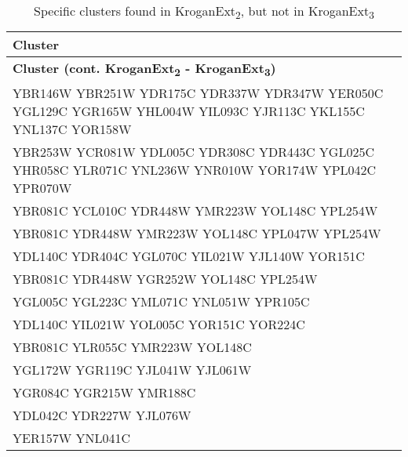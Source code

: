 \setlength{\extrarowheight}{2pt}
\renewcommand{\arraystretch}{1.2}
\begin{longtable}{| m{27em} |}
\caption{Specific clusters found in KroganExt\textsubscript{2}, but not in KroganExt\textsubscript{3}} \\
\hline
\textbf{Cluster} \\
\hline
\endfirsthead
\hline
\textbf{Cluster (cont. KroganExt\textsubscript{2} - KroganExt\textsubscript{3})} \\
\hline
\endhead
\hline
\endfoot
\hline
\endlastfoot
YBR146W YBR251W YDR175C YDR337W YDR347W YER050C YGL129C YGR165W YHL004W YIL093C YJR113C YKL155C YNL137C YOR158W \\
\hline
YBR253W YCR081W YDL005C YDR308C YDR443C YGL025C YHR058C YLR071C YNL236W YNR010W YOR174W YPL042C YPR070W \\
\hline
YBR081C YCL010C YDR448W YMR223W YOL148C YPL254W \\
\hline
YBR081C YDR448W YMR223W YOL148C YPL047W YPL254W \\
\hline
YDL140C YDR404C YGL070C YIL021W YJL140W YOR151C \\
\hline
YBR081C YDR448W YGR252W YOL148C YPL254W \\
\hline
YGL005C YGL223C YML071C YNL051W YPR105C \\
\hline
YDL140C YIL021W YOL005C YOR151C YOR224C \\
\hline
YBR081C YLR055C YMR223W YOL148C \\
\hline
YGL172W YGR119C YJL041W YJL061W \\
\hline
YGR084C YGR215W YMR188C \\
\hline
YDL042C YDR227W YJL076W \\
\hline
YER157W YNL041C \\
\hline
\end{longtable}